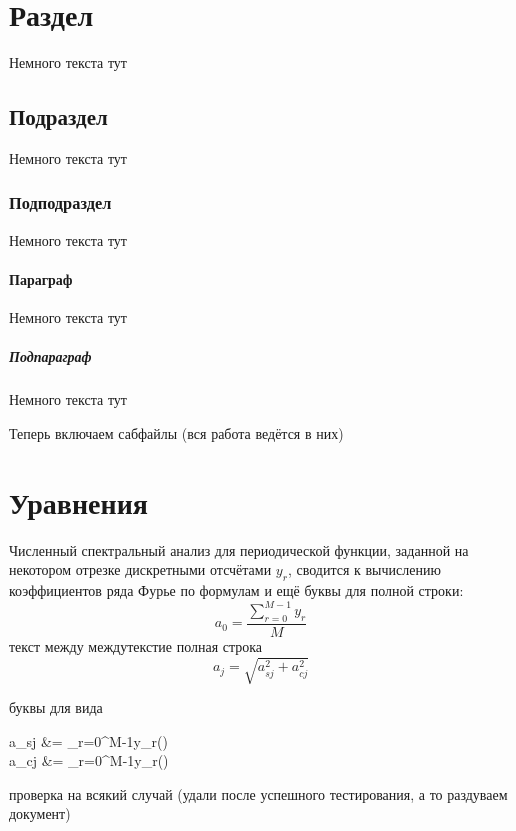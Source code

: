 \documentclass[a4paper]{article}
\begin{document}
	\tableofcontents
	\section{Раздел}
	Немного текста тут
	\subsection{Подраздел}
	Немного текста тут
	\subsubsection{Подподраздел}
	Немного текста тут
	\paragraph{Параграф}
	Немного текста тут
	\subparagraph{Подпараграф}
	Немного текста тут
	
	\newpage
	
	\vfill
	
	Теперь включаем сабфайлы (вся работа ведётся в них)
	
	\vfill
	
	\newpage
	
	

	
	\tableofcontents
	
	\section{Уравнения}
	Численный спектральный анализ для периодической функции, заданной на некотором отрезке дискретными отсчётами $y_r$, сводится к вычислению коэффициентов ряда Фурье по формулам и ещё буквы для полной строки:
	\begin{equation}\label{eq:a0}
		a_0=\frac{\sum\limits_{r=0}^{M-1}y_r}{M}
	\end{equation}
	текст между междутекстие полная строка
	\begin{equation}
		a_j=\sqrt{a_{sj}^2+a_{cj}^2}
	\end{equation}

буквы для вида
	\begin{aleq}\label{eq:ascj}
		a_{sj} &= \sum\limits_{r=0}^{M-1}y_r\sin\left(\right)\\
		a_{cj} &= \sum\limits_{r=0}^{M-1}y_r\cos\left(\right)
	\end{aleq}
проверка на всякий случай (удали после успешного тестирования, а то раздуваем документ)
	\nocite{*}
\end{document}

